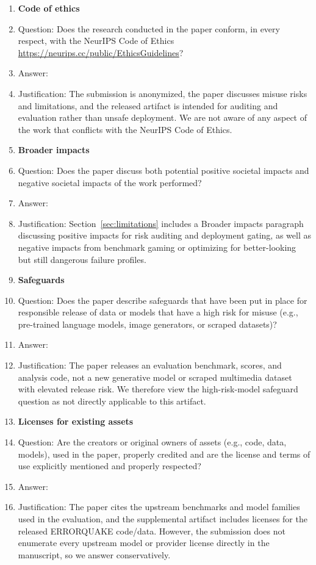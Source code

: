 \begin{enumerate}
\item {\bf Code of ethics}
    \item[] Question: Does the research conducted in the paper conform, in every respect, with the NeurIPS Code of Ethics \url{https://neurips.cc/public/EthicsGuidelines}?
    \item[] Answer: \answerYes{}
    \item[] Justification: The submission is anonymized, the paper discusses misuse risks and limitations, and the released artifact is intended for auditing and evaluation rather than unsafe deployment. We are not aware of any aspect of the work that conflicts with the NeurIPS Code of Ethics.

\item {\bf Broader impacts}
    \item[] Question: Does the paper discuss both potential positive societal impacts and negative societal impacts of the work performed?
    \item[] Answer: \answerYes{}
    \item[] Justification: Section~\ref{sec:limitations} includes a Broader impacts paragraph discussing positive impacts for risk auditing and deployment gating, as well as negative impacts from benchmark gaming or optimizing for better-looking but still dangerous failure profiles.

\item {\bf Safeguards}
    \item[] Question: Does the paper describe safeguards that have been put in place for responsible release of data or models that have a high risk for misuse (e.g., pre-trained language models, image generators, or scraped datasets)?
    \item[] Answer: \answerNA{}
    \item[] Justification: The paper releases an evaluation benchmark, scores, and analysis code, not a new generative model or scraped multimedia dataset with elevated release risk. We therefore view the high-risk-model safeguard question as not directly applicable to this artifact.

\item {\bf Licenses for existing assets}
    \item[] Question: Are the creators or original owners of assets (e.g., code, data, models), used in the paper, properly credited and are the license and terms of use explicitly mentioned and properly respected?
    \item[] Answer: \answerNo{}
    \item[] Justification: The paper cites the upstream benchmarks and model families used in the evaluation, and the supplemental artifact includes licenses for the released ERRORQUAKE code/data. However, the submission does not enumerate every upstream model or provider license directly in the manuscript, so we answer conservatively.


\end{enumerate}
